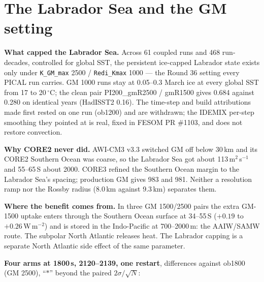 \documentclass[10pt]{article}
\begin{document}
\section{The Labrador Sea and the GM setting}\label{sec:gm}

\textbf{What capped the Labrador Sea.} Across 61 coupled runs and 468 run-decades, controlled for
global SST, the persistent ice-capped Labrador state exists only under \texttt{K\_GM\_max} 2500 /
\texttt{Redi\_Kmax} 1000 --- the Round 36 setting every PICAL run carries. GM 1000 runs stay at
0.05--0.3 March ice at every global SST from 17 to 20\,$^\circ$C; the clean pair PI200\_gmR2500 /
gmR1500 gives 0.684 against 0.280 on identical years (HadISST2 0.16). The time-step and build
attributions made first rested on one run (ob1200) and are withdrawn; the IDEMIX per-step
smoothing they pointed at is real, fixed in FESOM PR \#1103, and does not restore convection.

\textbf{Why CORE2 never did.} AWI-CM3 v3.3 switched GM off below 30\,km and its CORE2 Southern
Ocean was coarse, so the Labrador Sea got about 113\,m$^2$\,s$^{-1}$ and 55--65\,S about 2000.
CORE3 refined the Southern Ocean margin to the Labrador Sea's spacing; production GM gives 983
and 981. Neither a resolution ramp nor the Rossby radius (8.0\,km against 9.3\,km) separates them.

\textbf{Where the benefit comes from.} In three GM 1500/2500 pairs the extra GM-1500 uptake enters
through the Southern Ocean surface at 34--55\,S ($+0.19$ to $+0.26$\,W\,m$^{-2}$) and is stored in
the Indo-Pacific at 700--2000\,m: the AAIW/SAMW route. The subpolar North Atlantic releases heat.
The Labrador capping is a separate North Atlantic side effect of the same parameter.

\textbf{Four arms at 1800\,s, 2120--2139, one restart}, differences against ob1800 (GM 2500),
``$*$'' beyond the paired $2\sigma/\sqrt{N}$:
\end{document}
